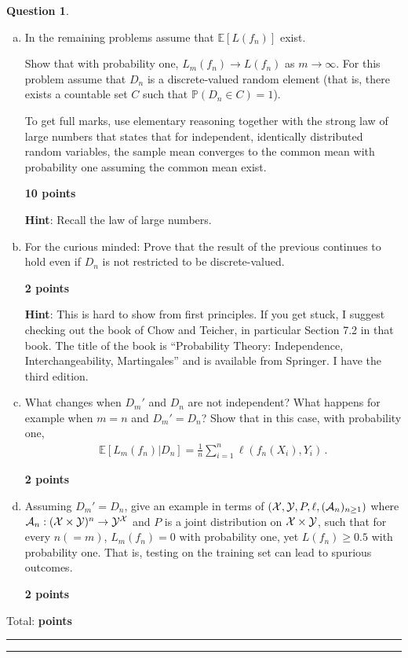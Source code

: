 \documentclass{article}
\DeclareMathOperator*{\1}{\mathbbm{1}}
\newcommand{\E}{\mathbb E}
\newcommand{\Prob}[1]{\mathbb{P}( #1 )}
\newcommand{\EE}[1]{\E[#1]}
\newcounter{DocPoints}
\newcounter{QuestionPoints}
\newcommand{\points}[1]{	\par\mbox{}\par\noindent\hfill {\bf #1 points}	\addtocounter{DocPoints}{#1}
	\addtocounter{QuestionPoints}{#1}
}
\newcommand{\tpoints}[1]{        	\ifthenelse{\isempty{#1}}	{	}	{		\addtocounter{DocPoints}{#1}
		\addtocounter{QuestionPoints}{#1}
	}													 	\par\mbox{}\par\noindent\hfill {Total: \bf \arabic{QuestionPoints}\xspace points}\par\mbox{}\par\hrule\hrule
	\setcounter{QuestionPoints}{0}
}
\theoremstyle{definition}
\newtheorem{question}{Question}
\theoremstyle{remark}
\newcommand{\hint}{\noindent \textbf{Hint}:\xspace}
\newcommand{\cA}{\mathcal{A}}
\begin{document}
\begin{question}
\begin{enumerate}[(a)]
\item \label{p:test1} 
In the remaining problems assume that $\EE{L(f_n)}$ exist.

Show that with probability one, $L_m(f_n) \to L(f_n)$ as $m\to \infty$.
For this problem assume that $D_n$ is a discrete-valued random element (that is, there exists a countable set $C$ such that $\Prob{D_n\in C} = 1$).

To get full marks, use elementary reasoning together with the strong law of large numbers that states that for independent, identically distributed random variables, the sample mean converges to the common mean with probability one assuming the common mean exist.
\points{10}

\hint Recall the law of large numbers. 

\item For the curious minded: Prove that the result of the previous continues to hold even if $D_n$ is not restricted to be discrete-valued.

\points{2}

\hint This is hard to show from first principles. If you get stuck, 
I suggest checking out the book of Chow and Teicher, in particular Section 7.2 in that book.
The title of the book is ``Probability Theory:
Independence, Interchangeability, Martingales'' and is available from Springer. I have the third edition.


\item \label{p:test2} What changes when $D_m'$ and $D_n$ are not independent? What happens for example when $m=n$ and $D_m'=D_n$? Show that in this case, with probability one,
\begin{align*}
\EE{L_m(f_n)|D_n} = \frac1n \sum_{i=1}^n \ell(f_n(X_i),Y_i)\,.
\end{align*}

\points{2}

\item \label{p:test3}
Assuming $D_m'=D_n$, give an example 
in terms of $(\cX,\cY,P,\ell,(\cA_n)_{n\ge 1})$  where $\cA_n: (\cX \times \cY)^n \to \cY^{\cX}$ 
and $P$ is a joint distribution on $\mathcal{X} \times \mathcal{Y}$,
such that
for every $n(=m)$,
$L_m(f_n)=0$ with probability one, yet $L(f_n)\ge 0.5$ with probability one.
That is, testing on the training set can lead to spurious outcomes.

\points{2}


\end{enumerate}
 
\tpoints{}
\end{question}
\end{document}
